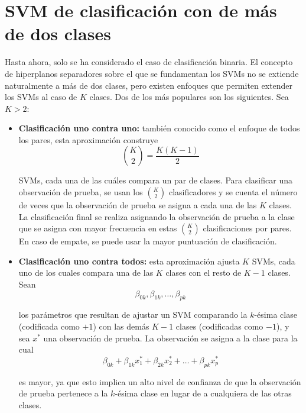 \section{SVM de clasificación con de más de dos clases}

Hasta ahora, solo se ha considerado el caso de clasificación binaria. El concepto de hiperplanos separadores sobre el que se fundamentan los SVMs no se extiende naturalmente a más de dos clases, pero existen enfoques que permiten extender los SVMs al caso de $K$ clases. Dos de los más populares son los siguientes. Sea $K > 2$:
\begin{itemize}
\item \textbf{Clasificación uno contra uno:} también conocido como el enfoque de todos los pares, esta aproximación construye 
\begin{equation}
\binom{K}{2} = \frac{K(K-1)}{2}
\end{equation} 

SVMs, cada una de las cuáles compara un par de clases. Para clasificar una observación de prueba, se usan los $\binom{K}{2}$ clasificadores y se cuenta el número de veces que la observación de prueba se asigna a cada una de las $K$ clases. La clasificación final se realiza asignando la observación de prueba a la clase que se asigna con mayor frecuencia en estas $\binom{K}{2}$ clasificaciones por pares. En caso de empate, se puede usar la mayor puntuación de clasificación.
\item \textbf{Clasificación uno contra todos:} esta aproximación ajusta $K$ SVMs, cada uno de los cuales compara una de las $K$ clases con el resto de $K - 1$ clases. Sean 
\begin{equation}
\beta_{0k}, \beta_{1k}, \ldots, \beta_{pk}
\end{equation}

los parámetros que resultan de ajustar un SVM comparando la $k$-ésima clase (codificada como $+1$) con las demás $K - 1$ clases (codificadas como $-1$), y sea $x^*$ una observación de prueba. La observación se asigna a la clase para la cual 
\begin{equation}
\beta_{0k} + \beta_{1k} x^*_1 + \beta_{2k} x^*_2 + \ldots + \beta_{pk} x^*_p
\end{equation}

es mayor, ya que esto implica un alto nivel de confianza de que la observación de prueba pertenece a la $k$-ésima clase en lugar de a cualquiera de las otras clases.
\end{itemize}



